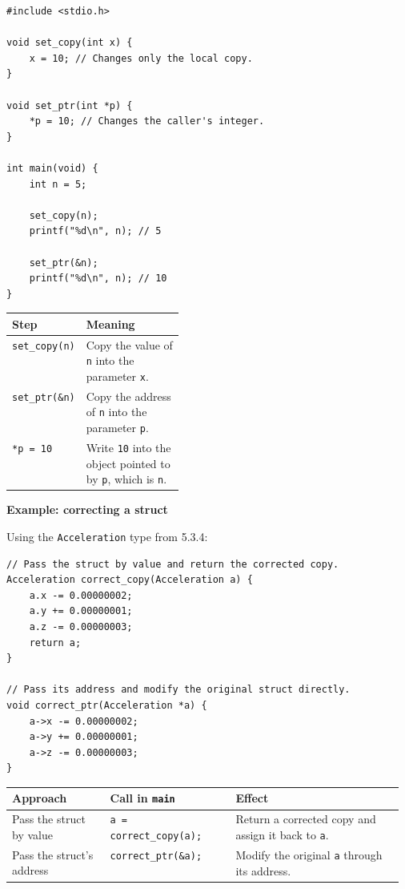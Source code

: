 \documentclass[11pt,a4paper]{article}
\begin{document}
\begin{lstlisting}[style=cscode]
#include <stdio.h>

void set_copy(int x) {
    x = 10; // Changes only the local copy.
}

void set_ptr(int *p) {
    *p = 10; // Changes the caller's integer.
}

int main(void) {
    int n = 5;

    set_copy(n);
    printf("%d\n", n); // 5

    set_ptr(&n);
    printf("%d\n", n); // 10
}
\end{lstlisting}

\begin{longtable}{@{}
    >{\raggedright\arraybackslash}p{0.25\linewidth}
    >{\raggedright\arraybackslash}p{}@{}}
\toprule
\textbf{Step} & \textbf{Meaning} \\
\midrule
\endhead
\bottomrule
\endlastfoot
\texttt{set\_copy(n)}
    & Copy the value of \texttt{n} into the parameter
      \texttt{x}. \\
\texttt{set\_ptr(\&n)}
    & Copy the address of \texttt{n} into the parameter
      \texttt{p}. \\
\texttt{*p = 10}
    & Write \texttt{10} into the object pointed to by
      \texttt{p}, which is \texttt{n}. \\
\end{longtable}

\textbf{Example: correcting a struct}

Using the \texttt{Acceleration} type from 5.3.4:

\begin{lstlisting}[style=cscode]
// Pass the struct by value and return the corrected copy.
Acceleration correct_copy(Acceleration a) {
    a.x -= 0.00000002;
    a.y += 0.00000001;
    a.z -= 0.00000003;
    return a;
}

// Pass its address and modify the original struct directly.
void correct_ptr(Acceleration *a) {
    a->x -= 0.00000002;
    a->y += 0.00000001;
    a->z -= 0.00000003;
}
\end{lstlisting}

\begin{longtable}{@{}
    >{\raggedright\arraybackslash}p{0.25\linewidth}
    >{\raggedright\arraybackslash}p{0.32\linewidth}
    >{\raggedright\arraybackslash}p{}@{}}
\toprule
\textbf{Approach} & \textbf{Call in \texttt{main}} &
\textbf{Effect} \\
\midrule
\endhead
\bottomrule
\endlastfoot
Pass the struct by value
    & \texttt{a = correct\_copy(a);}
    & Return a corrected copy and assign it back to
      \texttt{a}. \\
Pass the struct's address
    & \texttt{correct\_ptr(\&a);}
    & Modify the original \texttt{a} through its address. \\
\end{longtable}
\end{document}
